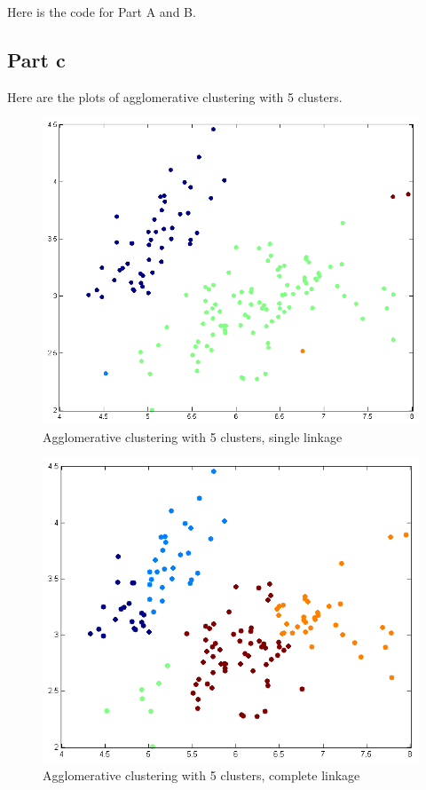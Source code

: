 \documentclass[twoside,11pt]{article}
\theoremstyle{definition}
\begin{document}
\newpage

Here is the code for Part A and B.


\newpage

\subsection*{Part c}

Here are the plots of agglomerative clustering with 5 clusters.  
\begin{figure}[h]
\centering
\includegraphics[width=6 in]{prob1PartC_1.png}
\caption{Agglomerative clustering with 5 clusters, single linkage}
\end{figure}

\newpage

\begin{figure}[h]
\centering
\includegraphics[width=6 in]{prob1PartC_2.png}
\caption{Agglomerative clustering with 5 clusters, complete linkage}
\end{figure}
\end{document}
